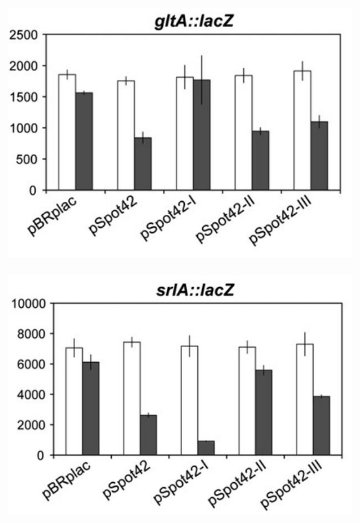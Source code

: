 \documentclass[twoside,a4paper]{report}
\numberwithin{equation}{section}
\begin{document}
 \begin{figure}[h!tb]
	\centering
	\begin{subfigure}{.5\textwidth}
		\centering
		\includegraphics[width=.7\linewidth]{gltA}	
		\label{fig:gltA}
	\end{subfigure}%
	\begin{subfigure}{.5\textwidth}
		\centering
		\includegraphics[width=.7\linewidth]{srlA}
		

\end{subfigure}
\end{figure}
\end{document}
